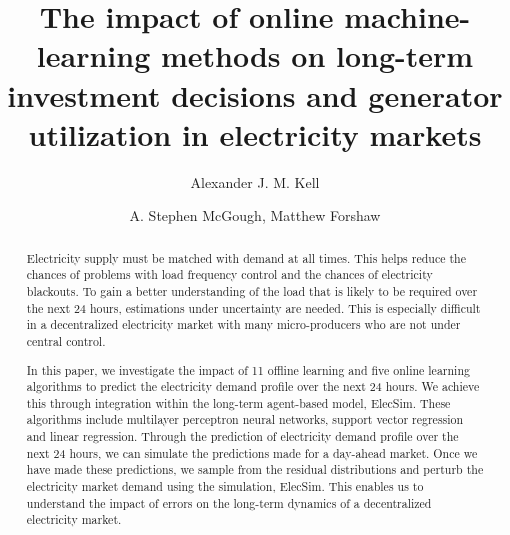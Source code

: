 \documentclass[final,3p,times,twocolumn,numbers]{elsarticle}
\begin{document}
\begin{frontmatter}


 \title{The impact of online machine-learning methods on long-term investment decisions and generator utilization in electricity markets}
 \author{Alexander J. M. Kell}



\author{A. Stephen McGough, Matthew Forshaw}

\address{School of Computing, Newcastle University, Newcastle upon Tyne, United Kingdom}

\begin{abstract}


Electricity supply must be matched with demand at all times. This helps reduce the chances of problems with load frequency control and the chances of electricity blackouts. To gain a better understanding of the load that is likely to be required over the next 24 hours, estimations under uncertainty are needed. This is especially difficult in a decentralized electricity market with many micro-producers who are not under central control. 


In this paper, we investigate the impact of 11 offline learning and five online learning algorithms to predict the electricity demand profile over the next 24 hours. We achieve this through integration within the long-term agent-based model, ElecSim. These algorithms include multilayer perceptron neural networks, support vector regression and linear regression. Through the prediction of electricity demand profile over the next 24 hours, we can simulate the predictions made for a day-ahead market. Once we have made these predictions, we sample from the residual distributions and perturb the electricity market demand using the simulation, ElecSim. This enables us to understand the impact of errors on the long-term dynamics of a decentralized electricity market.
 


\end{abstract}
\end{frontmatter}
\end{document}
